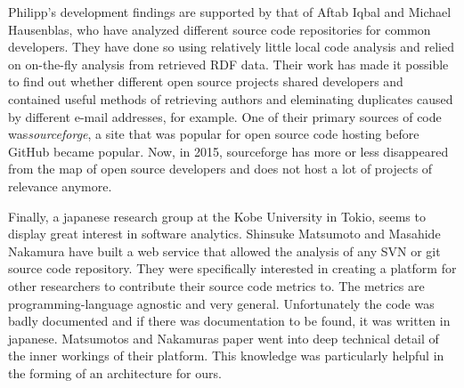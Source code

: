 Philipp's development findings are supported by that of
Aftab Iqbal and Michael Hausenblas, who have analyzed different
source code repositories for common developers\cite{ih:2012}.
They have done so using relatively little local code analysis and relied
on on-the-fly analysis from retrieved RDF data. Their work
has made it possible to find out whether different open source projects shared developers
and contained useful methods of retrieving authors and eleminating duplicates
caused by different e-mail addresses, for example.
One of their primary sources of code was\textit{sourceforge}, a site that was
popular for open source code hosting before GitHub became popular.
Now, in 2015, sourceforge has more or less disappeared from the map of open
source developers and does not host a lot of projects of relevance anymore.

Finally, a japanese research group at the Kobe University in Tokio, seems
to display great interest in software analytics\cite{mn:2011}. Shinsuke Matsumoto and Masahide Nakamura
have built a web service that allowed the analysis of any SVN or git source code repository.
They were specifically interested in creating a platform for other researchers to
contribute their source code metrics to. The metrics are programming-language agnostic
and very general. Unfortunately the code was badly documented and if there was documentation
to be found, it was written in japanese. Matsumotos and Nakamuras paper
went into deep technical detail of the inner workings of their platform.
This knowledge was particularly helpful in the forming of an architecture for ours.
